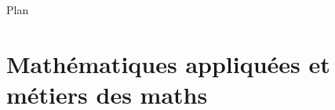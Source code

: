 \documentclass[slideopt,A4]{beamer}
\begin{document}
%
%

\begin{frame}{{\Large Plan}}
  \tableofcontents
\end{frame}



%
%


\section{Mathématiques appliquées et métiers des maths}
\end{document}
